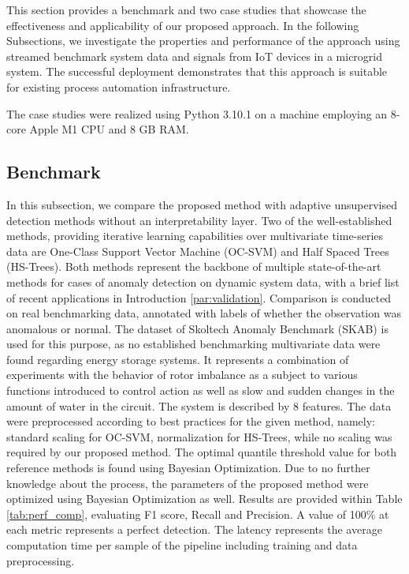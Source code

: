 This section provides a benchmark and two case studies that showcase the effectiveness and applicability of our proposed approach. In the following Subsections, we investigate the properties and performance of the approach using streamed benchmark system data and signals from IoT devices in a microgrid system. The successful deployment demonstrates that this approach is suitable for existing process automation infrastructure.

The case studies were realized using Python 3.10.1 on a machine employing an 8-core Apple M1 CPU and 8 GB RAM.

\subsection{Benchmark}\label{AA:Benchmark}
In this subsection, we compare the proposed method with adaptive unsupervised detection methods without an interpretability layer. Two of the well-established methods, providing iterative learning capabilities over multivariate time-series data are One-Class Support Vector Machine (OC-SVM) and Half Spaced Trees (HS-Trees). Both methods represent the backbone of multiple state-of-the-art methods for cases of anomaly detection on dynamic system data, with a brief list of recent applications in Introduction \ref{par:validation}. Comparison is conducted on real benchmarking data, annotated with labels of whether the observation was anomalous or normal. The dataset of Skoltech Anomaly Benchmark (SKAB) \cite{skab2020} is used for this purpose, as no established benchmarking multivariate data were found regarding energy storage systems. It represents a combination of experiments with the behavior of rotor imbalance as a subject to various functions introduced to control action as well as slow and sudden changes in the amount of water in the circuit. The system is described by 8 features. The data were preprocessed according to best practices for the given method, namely: standard scaling for OC-SVM, normalization for HS-Trees, while no scaling was required by our  proposed method. The optimal quantile threshold value for both reference methods is found using Bayesian Optimization. Due to no further knowledge about the process, the parameters of the proposed method were optimized using Bayesian Optimization as well. Results are provided within Table \ref{tab:perf_comp}, evaluating F1 score, Recall and Precision. A value of 100\% at each metric represents a perfect detection. The latency represents the average computation time per sample of the pipeline including training and data preprocessing.

